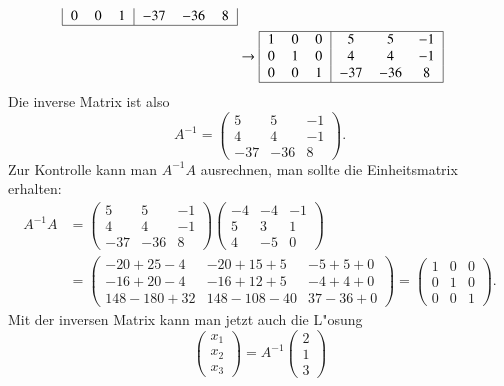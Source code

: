 \begin{beispiel}
\begin{align*}
\begin{tabular}{|>{$}c<{$}>{$}c<{$}>{$}c<{$}|>{$}c<{$}>{$}c<{$}>{$}c<{$}|}
   0&  0&       1 &-37        &     -36& 8\\
\hline
\end{tabular}
\\
&\rightarrow
\begin{tabular}{|>{$}c<{$}>{$}c<{$}>{$}c<{$}|>{$}c<{$}>{$}c<{$}>{$}c<{$}|}
\hline
   1&  0&       0 &       5   &       5&-1\\
   0&  1&       0 &       4   &       4&-1\\
   0&  0&       1 &-37        &     -36& 8\\
\hline
\end{tabular}
\end{align*}
Die inverse Matrix ist also
\[
A^{-1}=
\begin{pmatrix}
5&5&-1\\
4&4&-1\\
-37&-36&8
\end{pmatrix}.
\]
Zur Kontrolle kann man $A^{-1}A$ ausrechnen, man sollte die Einheitsmatrix
erhalten:
\begin{align*}
A^{-1}A&=
\begin{pmatrix}
5&5&-1\\
4&4&-1\\
-37&-36&8
\end{pmatrix}
\begin{pmatrix}
  -4& -4& -1\\
   5&  3&  1\\
   4& -5&  0
\end{pmatrix}
\\
&
=
\begin{pmatrix}
-20+25-4 & -20+15+5 & -5+5+0\\
-16+20-4 & -16+12+5 & -4+4+0\\
148-180+32 & 148-108-40&37-36+0
\end{pmatrix}
=\begin{pmatrix}
1&0&0\\0&1&0\\0&0&1\end{pmatrix}.
\end{align*}
Mit der inversen Matrix kann man jetzt auch die L"osung
\[
\begin{pmatrix}x_1\\x_2\\x_3\end{pmatrix}
=A^{-1}
\begin{pmatrix}2\\1\\3\end{pmatrix}
\]
\end{beispiel}
